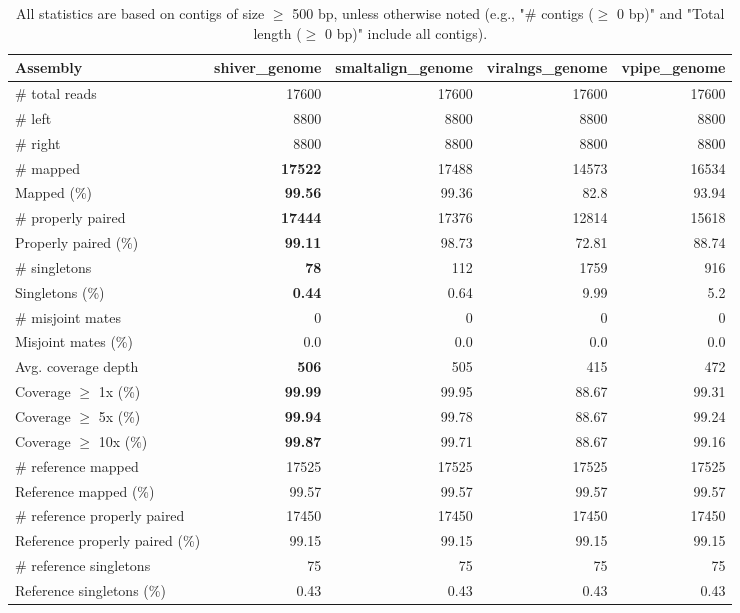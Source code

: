 \documentclass[12pt,a4paper]{article}
\begin{document}
\begin{table}[ht]
\begin{center}
\caption{All statistics are based on contigs of size $\geq$ 500 bp, unless otherwise noted (e.g., "\# contigs ($\geq$ 0 bp)" and "Total length ($\geq$ 0 bp)" include all contigs).}
\begin{tabular}{|l*{4}{|r}|}
\hline
Assembly & shiver\_genome & smaltalign\_genome & viralngs\_genome & vpipe\_genome \\ \hline
\# total reads & 17600 & 17600 & 17600 & 17600 \\ \hline
\# left & 8800 & 8800 & 8800 & 8800 \\ \hline
\# right & 8800 & 8800 & 8800 & 8800 \\ \hline
\# mapped & {\bf 17522} & 17488 & 14573 & 16534 \\ \hline
Mapped (\%) & {\bf 99.56} & 99.36 & 82.8 & 93.94 \\ \hline
\# properly paired & {\bf 17444} & 17376 & 12814 & 15618 \\ \hline
Properly paired (\%) & {\bf 99.11} & 98.73 & 72.81 & 88.74 \\ \hline
\# singletons & {\bf 78} & 112 & 1759 & 916 \\ \hline
Singletons (\%) & {\bf 0.44} & 0.64 & 9.99 & 5.2 \\ \hline
\# misjoint mates & 0 & 0 & 0 & 0 \\ \hline
Misjoint mates (\%) & 0.0 & 0.0 & 0.0 & 0.0 \\ \hline
Avg. coverage depth & {\bf 506} & 505 & 415 & 472 \\ \hline
Coverage $\geq$ 1x (\%) & {\bf 99.99} & 99.95 & 88.67 & 99.31 \\ \hline
Coverage $\geq$ 5x (\%) & {\bf 99.94} & 99.78 & 88.67 & 99.24 \\ \hline
Coverage $\geq$ 10x (\%) & {\bf 99.87} & 99.71 & 88.67 & 99.16 \\ \hline
\# reference mapped & 17525 & 17525 & 17525 & 17525 \\ \hline
Reference mapped (\%) & 99.57 & 99.57 & 99.57 & 99.57 \\ \hline
\# reference properly paired & 17450 & 17450 & 17450 & 17450 \\ \hline
Reference properly paired (\%) & 99.15 & 99.15 & 99.15 & 99.15 \\ \hline
\# reference singletons & 75 & 75 & 75 & 75 \\ \hline
Reference singletons (\%) & 0.43 & 0.43 & 0.43 & 0.43 \\ \hline

\end{tabular}
\end{center}
\end{table}
\end{document}
